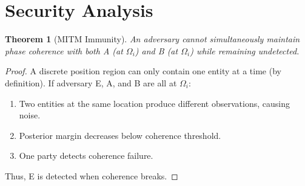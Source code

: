 \documentclass[twocolumn,10pt,a4paper]{article}
\theoremstyle{plain}
\newtheorem{theorem}{Theorem}[section]
\theoremstyle{definition}
\begin{document}
\section{Security Analysis}
\label{sec:security}

\begin{theorem}[MITM Immunity]
An adversary cannot simultaneously maintain phase coherence with both A (at $\Omega_i$) and B (at $\Omega_i$) while remaining undetected.
\end{theorem}

\begin{proof}
A discrete position region can only contain one entity at a time (by definition). If adversary E, A, and B are all at $\Omega_i$:
\begin{enumerate}
\item Two entities at the same location produce different observations, causing noise.
\item Posterior margin decreases below coherence threshold.
\item One party detects coherence failure.
\end{enumerate}
Thus, E is detected when coherence breaks.
\end{proof}
\end{document}
